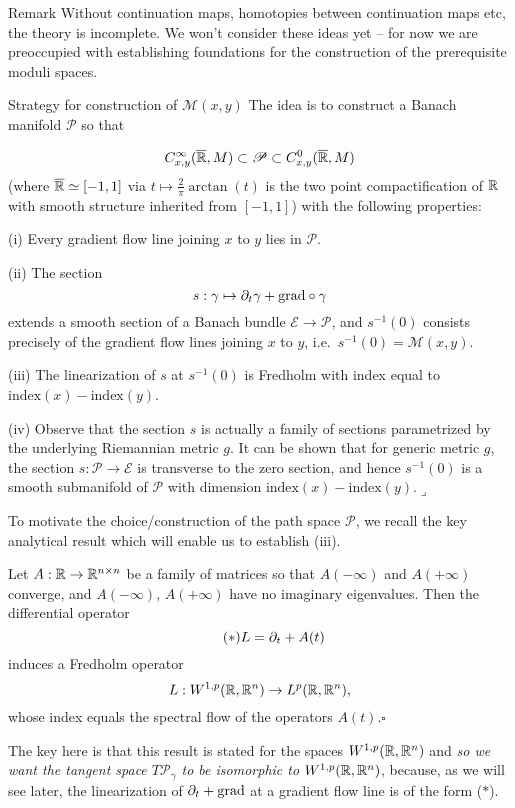 \documentclass{amsart}
\begin{document}
\begin{clear}{Remark}
Without continuation maps, homotopies between continuation maps etc,
the theory is incomplete. We won't consider these ideas yet -- for now
we are preoccupied with establishing foundations for the construction
of the prerequisite moduli spaces.
\end{clear}

\begin{clear}{Strategy for construction of $\mathscr{M}(x,y)$}  
The idea is to construct a Banach manifold $\mathscr{P}$ so that

$$C^{\infty}_{x,y}(\overline{\mathbb{R}},M)\subset\mathscr{P}\subset
C^{0}_{x,y}(\overline{\mathbb{R}},M)$$ (where $\overline{\mathbb{R}}\simeq [-1,1]$ via
$t\mapsto \frac{2}{\pi}\arctan(t)$ is the two point
compactification of $\mathbb{R}$ with smooth structure inherited from
$[-1,1]$) with the following properties:

(i) Every gradient flow line joining $x$ to $y$ lies in $\mathscr{P}$.

(ii) The section
\begin{equation*}
  s:\gamma \mapsto \partial_{t}\gamma+\mathrm{grad}\circ \gamma
\end{equation*}
extends a smooth section of a Banach bundle $\mathscr{E}\to
\mathscr{P}$, and $s^{-1}(0)$ consists precisely of the gradient flow
lines joining $x$ to $y$, i.e.\ $s^{-1}(0)=\mathscr{M}(x,y)$.

(iii) The linearization of $s$ at $s^{-1}(0)$ is Fredholm with index
equal to $\text{index}(x)-\text{index}(y)$.

(iv) Observe that the section $s$ is actually a family of sections
parametrized by the underlying Riemannian metric $g$. It can be shown that
for generic metric $g$, the section $s:\mathscr{P}\to \mathscr{E}$ is
transverse to the zero section, and hence $s^{-1}(0)$ is a smooth
submanifold of $\mathscr{P}$ with dimension $\text{index}(x)-\text{index}(y)$.\hfill$\lrcorner$
\end{clear}

To motivate the choice/construction of the path space $\mathscr{P}$,
we recall the key analytical result which will enable us to establish
(iii).
\begin{thm}\label{thm:a251}
  Let $A:\mathbb{R}\to \mathbb{R}^{n\times n}$ be a family of matrices so that
  $A(-\infty)$ and $A(+\infty)$ converge, and $A(-\infty)$,
  $A(+\infty)$ have no imaginary eigenvalues. Then the differential
  operator
  \begin{equation*}\tag{$\ast$}
    L=\partial_{t}+A(t)
  \end{equation*}
  induces a Fredholm operator
  \begin{equation*}
    L:W^{1,p}(\mathbb{R},\mathbb{R}^{n})\to L^{p}(\mathbb{R},\mathbb{R}^{n}),
  \end{equation*}
  whose index equals the spectral flow of the operators $A(t)$.\hfill $\square$
\end{thm}
The key here is that this result is stated for the spaces
$W^{1,p}(\mathbb{R},\mathbb{R}^{n})$ and \emph{so we want the tangent space
  $T\mathscr{P}_{\gamma}$ to be isomorphic to
  $W^{1,p}(\mathbb{R},\mathbb{R}^{n})$}, because, as we will see later, the linearization of
$\partial_{t}+\text{grad}$ at a gradient flow line is of the form
($\ast$).
\end{document}

